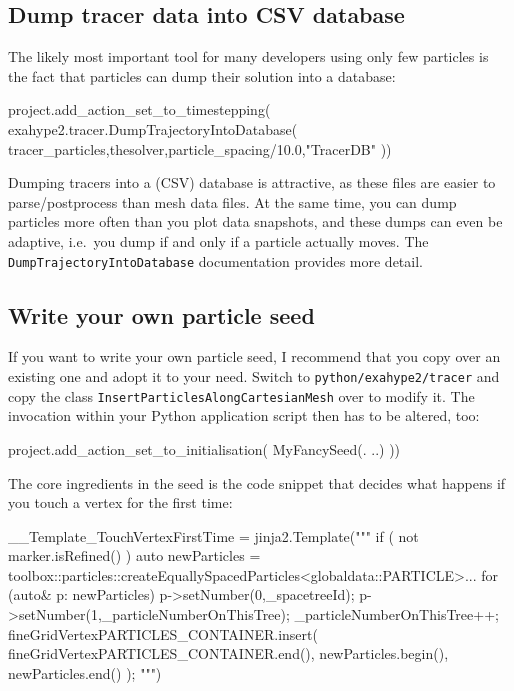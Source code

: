 \subsection{Dump tracer data into CSV database}

The likely most important tool for many developers using only few particles is
the fact that particles can dump their solution into a database:

\begin{code}
project.add_action_set_to_timestepping( 
 exahype2.tracer.DumpTrajectoryIntoDatabase(
  tracer_particles,thesolver,particle_spacing/10.0,"TracerDB"
))
\end{code}

\noindent
Dumping tracers into a (CSV) database is attractive, as these files are easier
to parse/postprocess than mesh data files. 
At the same time, you can dump particles more often than you plot data
snapshots, and these dumps can even be adaptive, i.e.~you dump if and only if a
particle actually moves.
The \texttt{DumpTrajectoryIntoDatabase} documentation provides more detail.


\subsection{Write your own particle seed}

If you want to write your own particle seed, I recommend that you copy over an
existing one and adopt it to your need.
Switch to \texttt{python/exahype2/tracer} and copy the class
\texttt{InsertParticlesAlongCartesianMesh} over to modify it.
The invocation within your Python application script then has to be altered,
too:

\begin{code}
project.add_action_set_to_initialisation( MyFancySeed(. ..) ))
\end{code}


\noindent
The core ingredients in the seed is the code snippet that decides what happens
if you touch a vertex for the first time:
\begin{code}
  __Template_TouchVertexFirstTime = jinja2.Template("""
  if ( not marker.isRefined() ) {
    auto newParticles =
    toolbox::particles::createEquallySpacedParticles<globaldata::{{PARTICLE}}>...
    for (auto& p: newParticles) {
      p->setNumber(0,_spacetreeId);
      p->setNumber(1,_particleNumberOnThisTree);
      _particleNumberOnThisTree++;
    }
    fineGridVertex{{PARTICLES_CONTAINER}}.insert( 
      fineGridVertex{{PARTICLES_CONTAINER}}.end(), newParticles.begin(),
      newParticles.end() 
    ); 
  }
""")
\end{code}

